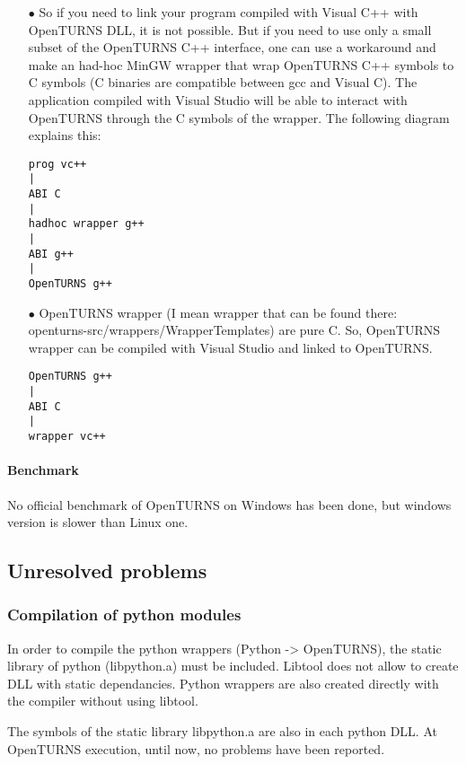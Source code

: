 \begin{itemize}
\item[$\bullet$] So if you need to link your program compiled with Visual C++ with OpenTURNS DLL, it is not possible.
But if you need to use only a small subset of the OpenTURNS C++ interface, one can use a workaround and make an had-hoc MinGW wrapper that wrap OpenTURNS C++ symbols to C symbols (C binaries are compatible between gcc and Visual C). The application compiled with Visual Studio will be able to interact with OpenTURNS through the C symbols of the wrapper. The following diagram explains this:
\begin{verbatim}
prog vc++
|
ABI C
|
hadhoc wrapper g++
|
ABI g++
|
OpenTURNS g++
\end{verbatim}

\item[$\bullet$] OpenTURNS wrapper (I mean wrapper that can be found there: openturns-src/wrappers/WrapperTemplates) are pure C.
So, OpenTURNS wrapper can be compiled with Visual Studio and linked to OpenTURNS.
\begin{verbatim}
OpenTURNS g++
|
ABI C
|
wrapper vc++
\end{verbatim}
\end{itemize}

\paragraph{Benchmark}

No official benchmark of OpenTURNS on Windows has been done, but windows version is slower than Linux one.


\subsection{Unresolved problems}


\subsubsection{Compilation of python modules}

In order to compile the python wrappers (Python -> OpenTURNS), the static library of python (libpython.a) must be included. Libtool does not allow to create DLL with static dependancies. Python wrappers are also created directly with the compiler without using libtool.

The symbols of the static library libpython.a are also in each python DLL. At OpenTURNS execution, until now, no problems have been reported.

